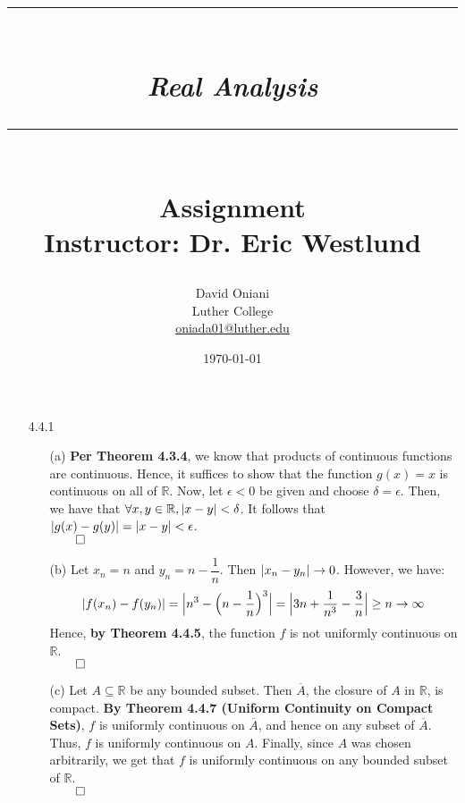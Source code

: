 \documentclass[11pt]{article}
\author{David Oniani\\
        Luther College\\
        \href{mailto:oniada01@luther.edu}{oniada01@luther.edu}}
\title{\rule{\paperwidth - 150pt}{1pt}\textbf{\\\textit{Real Analysis}\\}\rule
{\paperwidth - 150pt}{1pt}\\\textbf{Assignment \textnumero8}\\{\normalsize
Instructor: Dr. Eric Westlund}}
\date{\today}
\DeclarePairedDelimiter\abs{\lvert}{\rvert}%
\DeclarePairedDelimiter\absb{\Big\lvert}{\Big\rvert}%
\newcommand{\reals}{\mathbb{R}}
\begin{document}
\maketitle

%
%
%

\begin{itemize}
    \item[4.4.1]
        \begin{itemize}
            \item[(a)]
                \textbf{Per Theorem 4.3.4}, we know that products of continuous
                functions are continuous. Hence, it suffices to show that the
                function $g(x) = x$ is continuous on all of $\reals$. Now, let
                $\epsilon < 0$ be given and choose $\delta = \epsilon$.  Then,
                we have that $\forall x, y \in \reals, \abs{x - y} < \delta$.
                It follows that $\abs{g(x) - g(y)} = \abs{x - y} < \epsilon$.\\
                $\qed$

            \item[(b)]
                Let $x_n = n$ and $y_n = n - \dfrac{1}{n}$. Then $\abs{x_n -
                y_n} \to 0$. However, we have:
                \begin{equation*}
                    \abs{f(x_n) - f(y_n)} = \absb{n^3 - \Big(n - \dfrac{1}{n}
                    \Big)^3} = \absb{3n + \dfrac{1}{n^3} - \dfrac{3}{n}} \geq n
                    \to \infty
                \end{equation*}
                Hence, \textbf{by Theorem 4.4.5}, the function $f$ is not
                uniformly continuous on $\reals$.\\
                $\qed$

            \item[(c)]
                Let $A \subseteq \reals$ be any bounded subset. Then
                $\overline{A}$, the closure of $A$ in $\reals$, is compact.
                \textbf{By Theorem 4.4.7 (Uniform Continuity on Compact Sets)},
                $f$ is uniformly continuous on $\overline{A}$, and hence on any
                subset of $\overline{A}$. Thus, $f$ is uniformly continuous on
                $A$. Finally, since $A$ was chosen arbitrarily, we get that $f$
                is uniformly continuous on any bounded subset of $\reals$.\\
                $\qed$
        \end{itemize}


\end{itemize}
\end{document}
